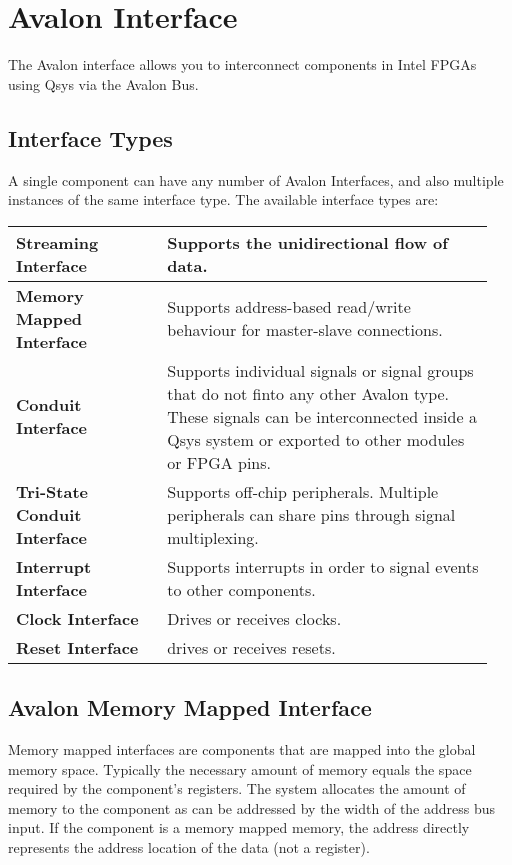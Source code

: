 \section{Avalon Interface}
	The Avalon interface allows you to interconnect components in Intel FPGAs using Qsys via the Avalon Bus.
	
	\subsection{Interface Types }
		A single component can have any number of Avalon Interfaces, and also multiple instances of the same interface type. The available interface types are:
			\begin{longtable}{|>{\bfseries}p{0.3\linewidth}|p{0.65\linewidth}|}
				\hline
				Streaming Interface
					& Supports the unidirectional flow of data.\\
				\hline
				Memory Mapped Interface
					& Supports address-based read/write behaviour for master-slave connections.\\
				\hline
				Conduit Interface
					& Supports individual signals or signal groups that do not finto any other Avalon type.
					These signals can be interconnected inside a Qsys system or exported to other modules or FPGA pins.\\
				\hline
				Tri-State Conduit Interface
					& Supports off-chip peripherals. Multiple peripherals can share pins through signal multiplexing.\\
				\hline
				Interrupt Interface
					& Supports interrupts in order to signal events to other components.\\
				\hline
				Clock Interface
					& Drives or receives clocks.\\
				\hline
				Reset Interface
					& drives or receives resets.\\
				\hline	
			\end{longtable}
		
	\subsection{Avalon Memory Mapped Interface }
		Memory mapped interfaces are components that are mapped into the global memory space. Typically the necessary amount of memory equals the space required by the component's registers. The system allocates the amount of memory to the component as can be addressed by the width of the address bus input. If the component is a memory mapped memory, the address directly represents the address location of the data (not a register).
		
